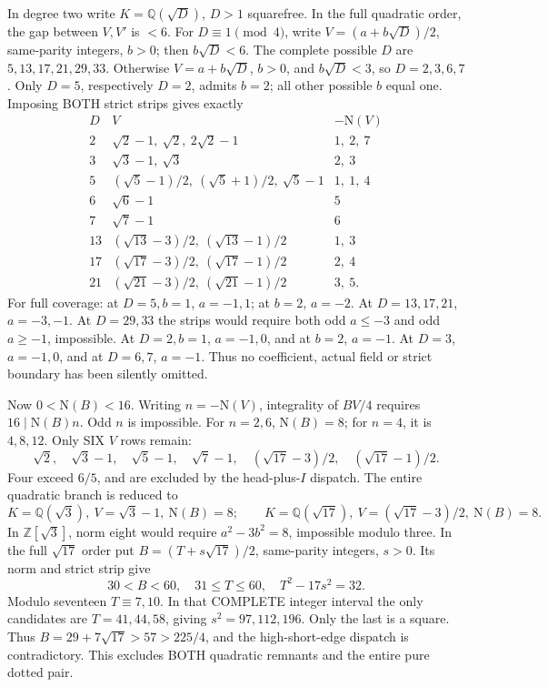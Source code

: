 \documentclass[11pt]{article}
\begin{document}
In degree two write \(K=\mathbb Q(\sqrt D)\),
\(D>1\) squarefree.
In the full quadratic order, the gap between
\(V,V'\) is \(<6\).
For \(D\equiv1\pmod4\), write
\(V=(a+b\sqrt D)/2\), same-parity integers,
\(b>0\); then \(b\sqrt D<6\).
The complete possible \(D\) are \(5,13,17,21,29,33\).
Otherwise \(V=a+b\sqrt D\), \(b>0\), and
\(b\sqrt D<3\), so \(D=2,3,6,7\).
Only \(D=5\), respectively \(D=2\), admits \(b=2\);
all other possible \(b\) equal one.
Imposing BOTH strict strips gives exactly
\[
\begin{array}{c|c|r}
 D&V&-\mathrm N(V)\\ \hline
2&\sqrt2-1,\ \sqrt2,\ 2\sqrt2-1&1,\ 2,\ 7\\
3&\sqrt3-1,\ \sqrt3&2,\ 3\\
5&(\sqrt5-1)/2,\ (\sqrt5+1)/2,\ \sqrt5-1&1,\ 1,\ 4\\
6&\sqrt6-1&5\\
7&\sqrt7-1&6\\
13&(\sqrt{13}-3)/2,\ (\sqrt{13}-1)/2&1,\ 3\\
17&(\sqrt{17}-3)/2,\ (\sqrt{17}-1)/2&2,\ 4\\
21&(\sqrt{21}-3)/2,\ (\sqrt{21}-1)/2&3,\ 5 .
\end{array}
\]
For full coverage: at \(D=5,b=1\), \(a=-1,1\);
at \(b=2\), \(a=-2\).
At \(D=13,17,21\), \(a=-3,-1\).
At \(D=29,33\) the strips would require both
odd \(a\le-3\) and odd \(a\ge-1\), impossible.
At \(D=2,b=1\), \(a=-1,0\), and at \(b=2\),
\(a=-1\).
At \(D=3\), \(a=-1,0\), and at \(D=6,7\),
\(a=-1\).
Thus no coefficient, actual field or strict boundary
has been silently omitted.

Now \(0<\mathrm N(B)<16\).
Writing \(n=-\mathrm N(V)\), integrality of \(BV/4\)
requires \(16\mid\mathrm N(B)n\).
Odd \(n\) is impossible.
For \(n=2,6\), \(\mathrm N(B)=8\);
for \(n=4\), it is \(4,8,12\).
Only SIX \(V\) rows remain:
\[
 \sqrt2,\quad\sqrt3-1,\quad\sqrt5-1,\quad\sqrt7-1,\quad
 (\sqrt{17}-3)/2,\quad(\sqrt{17}-1)/2 .
\]
Four exceed \(6/5\), and are excluded by the
head-plus-\(I\) dispatch.
The entire quadratic branch is reduced to
\[
 K=\mathbb Q(\sqrt3),\ V=\sqrt3-1,\ \mathrm N(B)=8;
 \qquad
 K=\mathbb Q(\sqrt{17}),\
 V=(\sqrt{17}-3)/2,\ \mathrm N(B)=8 .
\]
In \(\mathbb Z[\sqrt3]\), norm eight would require
\(a^2-3b^2=8\), impossible modulo three.
In the full \(\sqrt{17}\) order put
\(B=(T+s\sqrt{17})/2\), same-parity integers, \(s>0\).
Its norm and strict strip give
\[
               30<B<60,\quad31\le T\le60,\quad
               T^2-17s^2=32 .
\]
Modulo seventeen \(T\equiv7,10\).
In that COMPLETE integer interval the only candidates
are \(T=41,44,58\), giving \(s^2=97,112,196\).
Only the last is a square.
Thus \(B=29+7\sqrt{17}>57>225/4\),
and the high-short-edge dispatch is contradictory.
This excludes BOTH quadratic remnants and the entire
pure dotted pair.
\end{document}
